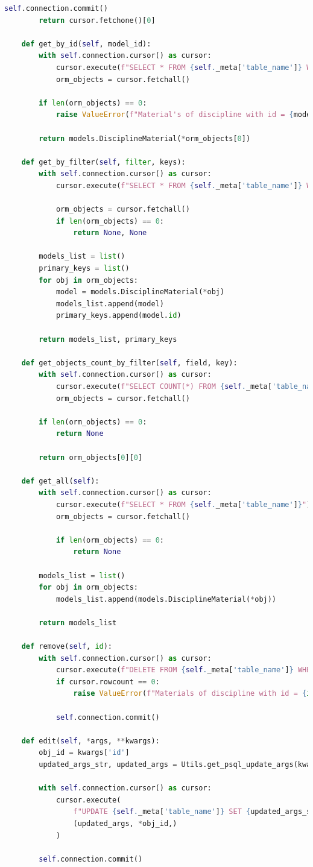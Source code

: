 \begin{lstlisting}[label=lst:db-postgresql, caption=Листинг модуля взаимодействия c СУБД PostgreSQL, language=python]
		self.connection.commit()
		return cursor.fetchone()[0]
	
	def get_by_id(self, model_id):
		with self.connection.cursor() as cursor:
			cursor.execute(f"SELECT * FROM {self._meta['table_name']} WHERE id = %s", (model_id,))
			orm_objects = cursor.fetchall()
		
		if len(orm_objects) == 0:
			raise ValueError(f"Material's of discipline with id = {model_id} doesn't exists")
		
		return models.DisciplineMaterial(*orm_objects[0])
	
	def get_by_filter(self, filter, keys):
		with self.connection.cursor() as cursor:
			cursor.execute(f"SELECT * FROM {self._meta['table_name']} WHERE {filter}", keys)
		
			orm_objects = cursor.fetchall()
			if len(orm_objects) == 0:
				return None, None
		
		models_list = list()
		primary_keys = list()
		for obj in orm_objects:
			model = models.DisciplineMaterial(*obj)
			models_list.append(model)
			primary_keys.append(model.id)
			
		return models_list, primary_keys
	
	def get_objects_count_by_filter(self, field, key):
		with self.connection.cursor() as cursor:
			cursor.execute(f"SELECT COUNT(*) FROM {self._meta['table_name']} WHERE {field} = %s", (key,))
			orm_objects = cursor.fetchall()
	
		if len(orm_objects) == 0:
			return None
	
		return orm_objects[0][0]
	
	def get_all(self):
		with self.connection.cursor() as cursor:
			cursor.execute(f"SELECT * FROM {self._meta['table_name']}")
			orm_objects = cursor.fetchall()
			
			if len(orm_objects) == 0:
				return None
		
		models_list = list()
		for obj in orm_objects:
			models_list.append(models.DisciplineMaterial(*obj))
		
		return models_list
	
	def remove(self, id):
		with self.connection.cursor() as cursor:
			cursor.execute(f"DELETE FROM {self._meta['table_name']} WHERE id = %s", (id,))
			if cursor.rowcount == 0:
				raise ValueError(f"Materials of discipline with id = {id} doesn't exists.")
	
			self.connection.commit()
	
	def edit(self, *args, **kwargs):
		obj_id = kwargs['id']
		updated_args_str, updated_args = Utils.get_psql_update_args(kwargs['fields'])
		
		with self.connection.cursor() as cursor:
			cursor.execute(
				f"UPDATE {self._meta['table_name']} SET {updated_args_str} WHERE id = %s",
				(updated_args, *obj_id,)
			)
		
		self.connection.commit()
\end{lstlisting}

